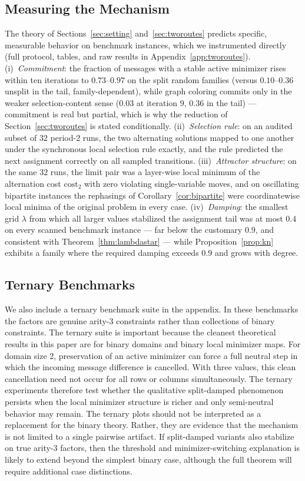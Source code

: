 \subsection{Measuring the Mechanism}
\label{sec:mechanism}
The theory of Sections~\ref{sec:setting} and~\ref{sec:tworoutes} predicts
specific, measurable behavior on benchmark instances, which we instrumented
directly (full protocol, tables, and raw results in
Appendix~\ref{app:tworoutes}).  (i)~\emph{Commitment}: the fraction of
messages with a stable active minimizer rises within ten iterations to
$0.73$--$0.97$ on the split random families (versus $0.10$--$0.36$ unsplit
in the tail, family-dependent), while graph coloring commits only in the
weaker selection-content sense ($0.03$ at iteration $9$, $0.36$ in the
tail) --- commitment is real but partial, which is why the reduction of
Section~\ref{sec:tworoutes} is stated conditionally.  (ii)~\emph{Selection
rule}: on an audited subset of $32$ period-2 runs, the two alternating
solutions mapped to one another under the synchronous local selection rule
exactly, and the rule predicted the next assignment correctly on all
sampled transitions.  (iii)~\emph{Attractor structure}: on the same $32$
runs, the limit pair was a layer-wise local minimum of the alternation
cost $\mathrm{cost}_2$ with zero violating single-variable moves, and on
oscillating bipartite instances the rephasings of
Corollary~\ref{cor:bipartite} were coordinatewise local minima of the
original problem in every case.  (iv)~\emph{Damping}: the smallest grid
$\lambda$ from which all larger values stabilized the assignment tail was
at most $0.4$ on every scanned benchmark instance --- far below the
customary $0.9$, and consistent with Theorem~\ref{thm:lambdastar} ---
while Proposition~\ref{prop:kn} exhibits a family where the required
damping exceeds $0.9$ and grows with degree.
\subsection{Ternary Benchmarks}
We also include a ternary benchmark suite in the appendix.  In these benchmarks
the factors are genuine arity-3 constraints rather than collections of binary
constraints.  The ternary suite is important because the cleanest theoretical
results in this paper are for binary domains and binary local minimizer maps.
For domain size 2, preservation of an active minimizer can force a full neutral
step in which the incoming message difference is cancelled.  With three values,
this clean cancellation need not occur for all rows or columns simultaneously.
The ternary experiments therefore test whether the qualitative split-damped
phenomenon persists when the local minimizer structure is richer and only
semi-neutral behavior may remain.
The ternary plots should not be interpreted as a replacement for the binary
theory.  Rather, they are evidence that the mechanism is not limited to a
single pairwise artifact.  If split-damped variants also stabilize on true
arity-3 factors, then the threshold and minimizer-switching explanation is
likely to extend beyond the simplest binary case, although the full theorem
will require additional case distinctions.
